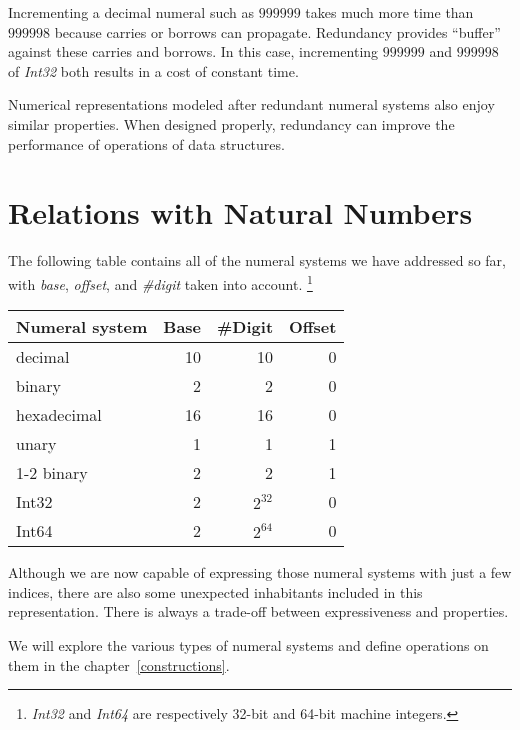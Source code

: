 \documentclass[\main/thesis.tex]{subfiles}
\begin{document}
Incrementing a decimal numeral such as $ 999999 $ takes much more time than
$ 999998 $ because carries or borrows can propagate.
Redundancy provides ``buffer'' against these carries and borrows.
In this case, incrementing $ 999999 $ and $ 999998 $ of \textit{Int32} both
results in a cost of constant time.

Numerical representations modeled after redundant numeral systems also enjoy
similar properties. When designed properly, redundancy can improve the performance
of operations of data structures.


\section{Relations with Natural Numbers}

The following table contains all of the numeral systems we have addressed so far,
with \textit{base}, \textit{offset}, and \textit{\#digit} taken into account.
\footnote{
\textit{Int32} and \textit{Int64} are respectively 32-bit and 64-bit machine
integers.
}

\begin{center}
    \begin{adjustbox}{max width=\textwidth}
    \begin{tabular}{ | l | r | r | r | }
    \textbf{Numeral system} & \textbf{Base} & \textbf{\#Digit} & \textbf{Offset} \\
    \hline
    decimal         & 10 & 10 & 0 \\
    binary          & 2  & 2  & 0 \\
    hexadecimal     & 16 & 16 & 0 \\
    unary           & 1  & 1  & 1 \\
    1-2 binary      & 2  & 2  & 1 \\
    Int32           & 2  & $ 2^{32} $ & 0 \\
    Int64           & 2  & $ 2^{64} $ & 0 \\
    \end{tabular}
    \end{adjustbox}
\end{center}

Although we are now capable of expressing those numeral systems with just a few
indices, there are also some unexpected inhabitants included in this representation.
There is always a trade-off between expressiveness and properties.

We will explore the various types of numeral systems and define operations on
them in the chapter~\ref{constructions}.
\end{document}
